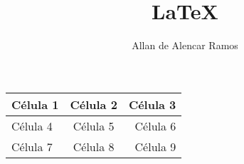 \documentclass[12pt, a4paper]{article}
\begin{document}
\title{LaTeX}
\author{Allan de Alencar Ramos}
\maketitle

\begin{tabular}{| l | c | r |} \hline
	Célula 1 & Célula 2 & Célula 3 \\ \hline
	Célula  4 & Célula 5 & Célula 6 \\ \hline
	Célula 7 & Célula 8 & Célula 9 \\ \hline
\end{tabular}
\end{document}
